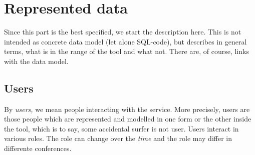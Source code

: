 \section{Represented data}

Since this part is the best specified, we start the description here. This
is not intended as concrete data model (let alone SQL-code), but describes
in general terms, what is in the range of the tool and what not. There are,
of course, links with the data model.





\subsection{Users}
\label{sec:users}


By \emph{users,} we mean people interacting with the service. More
precisely, users are those people which are represented and modelled in one
form or the other inside the tool, which is to say, some accidental surfer
is not user. Users interact in various roles. The role can change over the
\emph{time} and the role may differ in differente conferences.

